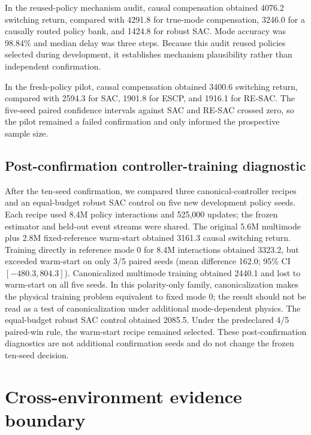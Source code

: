 In the reused-policy mechanism audit, causal compensation obtained 4076.2 switching return, compared with 4291.8 for true-mode compensation, 3246.0 for a causally routed policy bank, and 1424.8 for robust SAC. Mode accuracy was 98.84\% and median delay was three steps. Because this audit reused policies selected during development, it establishes mechanism plausibility rather than independent confirmation.

In the fresh-policy pilot, causal compensation obtained 3400.6 switching return, compared with 2594.3 for SAC, 1901.8 for ESCP, and 1916.1 for RE-SAC. The five-seed paired confidence intervals against SAC and RE-SAC crossed zero, so the pilot remained a failed confirmation and only informed the prospective sample size.

\subsection{Post-confirmation controller-training diagnostic}

After the ten-seed confirmation, we compared three canonical-controller recipes and an equal-budget robust SAC control on five new development policy seeds. Each recipe used 8.4M policy interactions and 525,000 updates; the frozen estimator and held-out event streams were shared. The original 5.6M multimode plus 2.8M fixed-reference warm-start obtained 3161.3 causal switching return. Training directly in reference mode 0 for 8.4M interactions obtained 3323.2, but exceeded warm-start on only 3/5 paired seeds (mean difference 162.0; 95\% CI $[-480.3,804.3]$). Canonicalized multimode training obtained 2440.1 and lost to warm-start on all five seeds. In this polarity-only family, canonicalization makes the physical training problem equivalent to fixed mode 0; the result should not be read as a test of canonicalization under additional mode-dependent physics. The equal-budget robust SAC control obtained 2085.5. Under the predeclared 4/5 paired-win rule, the warm-start recipe remained selected. These post-confirmation diagnostics are not additional confirmation seeds and do not change the frozen ten-seed decision.

\section{Cross-environment evidence boundary}
\label{app:cross_environment}

